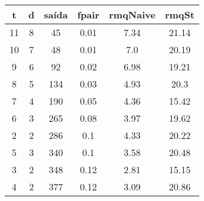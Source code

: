 \begin{tabular}{|c|c|c|c|c|c|}
\hline
\textbf{t} & \textbf{d} & \textbf{saída} & \textbf{fpair} & \textbf{rmqNaive} & \textbf{rmqSt}\\
\hline
11 & 8 & 45 & 0.01 & 7.34 & 21.14\\
\hline
10 & 7 & 48 & 0.01 & 7.0 & 20.19\\
\hline
9 & 6 & 92 & 0.02 & 6.98 & 19.21\\
\hline
8 & 5 & 134 & 0.03 & 4.93 & 20.3\\
\hline
7 & 4 & 190 & 0.05 & 4.36 & 15.42\\
\hline
6 & 3 & 265 & 0.08 & 3.97 & 19.62\\
\hline
2 & 2 & 286 & 0.1 & 4.33 & 20.22\\
\hline
5 & 3 & 340 & 0.1 & 3.58 & 20.48\\
\hline
3 & 2 & 348 & 0.12 & 2.81 & 15.15\\
\hline
4 & 2 & 377 & 0.12 & 3.09 & 20.86\\
\hline
\end{tabular}
